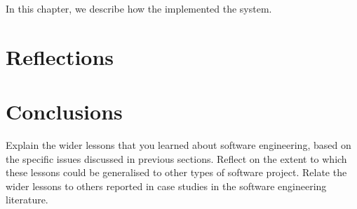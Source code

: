 \documentclass{l3proj}
\begin{document}
In this chapter, we describe how the implemented the system.

\section{Reflections}
\label{sec:reflections}

\section{Conclusions}
\label{sec:conclusions}

Explain the wider lessons that you learned about software engineering,
based on the specific issues discussed in previous sections.  Reflect
on the extent to which these lessons could be generalised to other
types of software project.  Relate the wider lessons to others
reported in case studies in the software engineering literature.



\end{document}
